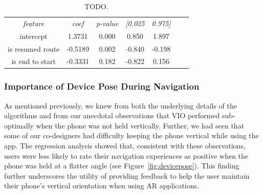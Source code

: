 \documentclass[chi]{sigchi}
\begin{document}
\begin{table}
  \centering
\begin{tabular}{c  c c c c c c}
{\small \textit{feature}}	& {\small \textit{coef}}  & {\small \textit{p-value}} & {\small \textit{[0.025}} & 	{\small \textit{0.975]}} \\
intercept	& 1.3731&	0.000 &	0.850 &	1.897 \\
is resumed route	& -0.5189	& 0.002 & 	-0.840 & 	-0.198 \\
is end to start	& -0.3331	& 0.182	& -0.822	& 0.156
\end{tabular}
  \caption{TODO.\label{tab:binaryfeatures}}
\end{table}

\subsubsection{Importance of Device Pose During Navigation}


As mentioned previously, we knew from both the underlying details of the algorithms and from our anecdotal observations that VIO performed sub-optimally when the phone was not held vertically.  Further, we had seen that some of our co-designers had difficulty keeping the phone vertical while using the app. The regression analysis showed that, consistent with these observations, users were less likely to rate their navigation experiences as positive when the phone was held at a flatter angle (see Figure~\ref{fig:devicepose}).  This finding further underscores the utility of providing feedback to help the user maintain their phone's vertical orientation when using AR applications.
\end{document}
